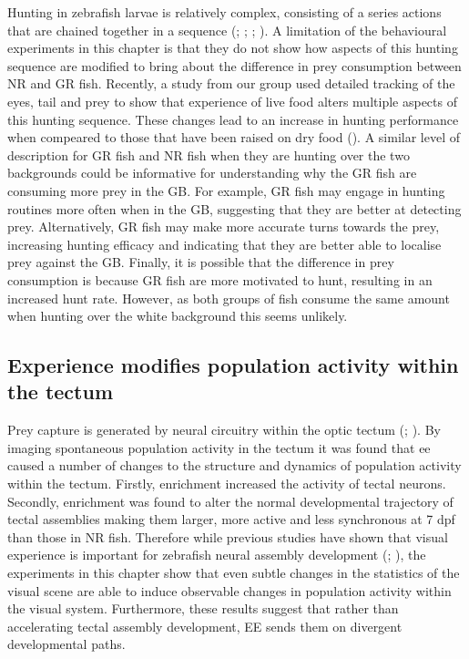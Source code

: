 Hunting in zebrafish larvae is relatively complex, consisting of a series actions that are chained together in a sequence (\cite{McElligott2005PreyControl}; \cite{Budick2000LocomotorCapture}; \cite{Gahtan2005}; \cite{Patterson2013}). A limitation of the behavioural experiments in this chapter is that they do not show how aspects of this hunting sequence are modified to bring about the difference in prey consumption between NR and GR fish. Recently, a study from our group used detailed tracking of the eyes, tail and prey to show that experience of live food alters multiple aspects of this hunting sequence. These changes lead to an increase in hunting performance when compeared to those that have been raised on dry food (\cite{Lagogiannis2019LearningLarvae}). A similar level of description for GR fish and NR fish when they are hunting over the two backgrounds could be informative for understanding why the GR fish are consuming more prey in the GB. For example, GR fish may engage in hunting routines more often when in the GB, suggesting that they are better at detecting prey. Alternatively, GR fish may make more accurate turns towards the prey, increasing hunting efficacy and indicating that they are better able to localise prey against the GB. Finally, it is possible that the difference in prey consumption is because GR fish are more motivated to hunt, resulting in an increased hunt rate. However, as both groups of fish consume the same amount when hunting over the white background this seems unlikely.

\subsection{Experience modifies population activity within the tectum}
Prey capture is generated by neural circuitry within the optic tectum (\cite{Gahtan2005}; \cite{Bianco2015}). By imaging spontaneous population activity in the tectum it was found that \gls{ee} caused a number of changes to the structure and dynamics of population activity within the tectum. Firstly, enrichment increased the activity of tectal neurons. Secondly, enrichment was found to alter the normal developmental trajectory of tectal assemblies making them larger, more active and less synchronous at 7 \gls{dpf} than those in NR fish. Therefore while previous studies have shown that visual experience is important for zebrafish neural assembly development (\cite{Avitan2017}; \cite{Pietri2017}), the experiments in this chapter show that even subtle changes in the statistics of the visual scene are able to induce observable changes in population activity within the visual system. Furthermore, these results suggest that rather than accelerating tectal assembly development, EE sends them on divergent developmental paths. 

